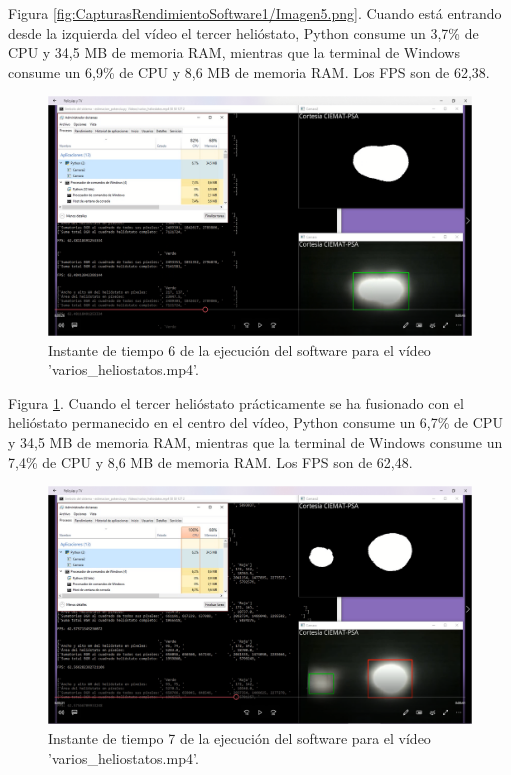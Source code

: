 Figura \ref{fig:CapturasRendimientoSoftware1/Imagen5.png}. Cuando está entrando desde la izquierda del vídeo el tercer helióstato, Python consume un 3,7\% de CPU y 34,5 MB de memoria RAM, mientras que la terminal de Windows consume un 6,9\% de CPU y 8,6 MB de memoria RAM. Los FPS son de 62,38.\\[20pt]

\begin{figure}[h!]
  	\centering
	\includegraphics[width=\textwidth]{CapturasRendimientoSoftware1/Imagen6.png}
	\caption{Instante de tiempo 6 de la ejecución del software para el vídeo 'varios\_heliostatos.mp4'.
	\label{fig:CapturasRendimientoSoftware1/Imagen6.png}}
\end{figure}

Figura \ref{fig:CapturasRendimientoSoftware1/Imagen6.png}. Cuando el tercer helióstato prácticamente se ha fusionado con el helióstato permanecido en el centro del vídeo, Python consume un 6,7\% de CPU y 34,5 MB de memoria RAM, mientras que la terminal de Windows consume un 7,4\% de CPU y 8,6 MB de memoria RAM. Los FPS son de 62,48.\\[20pt]

\begin{figure}[h!]
  	\centering
	\includegraphics[width=\textwidth]{CapturasRendimientoSoftware1/Imagen7.png}
	\caption{Instante de tiempo 7 de la ejecución del software para el vídeo 'varios\_heliostatos.mp4'.
	\label{fig:CapturasRendimientoSoftware1/Imagen7.png}}
\end{figure}

